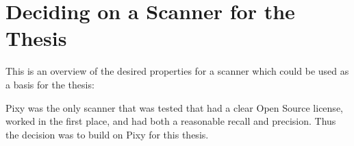 \section{Deciding on a Scanner for the Thesis}

This is an overview of the desired properties for a scanner which could be used as a basis for the thesis:


Pixy was the only scanner that was tested that had a clear Open Source license, worked in the first place, and had both a reasonable recall and precision. Thus the decision was to build on Pixy for this thesis.
